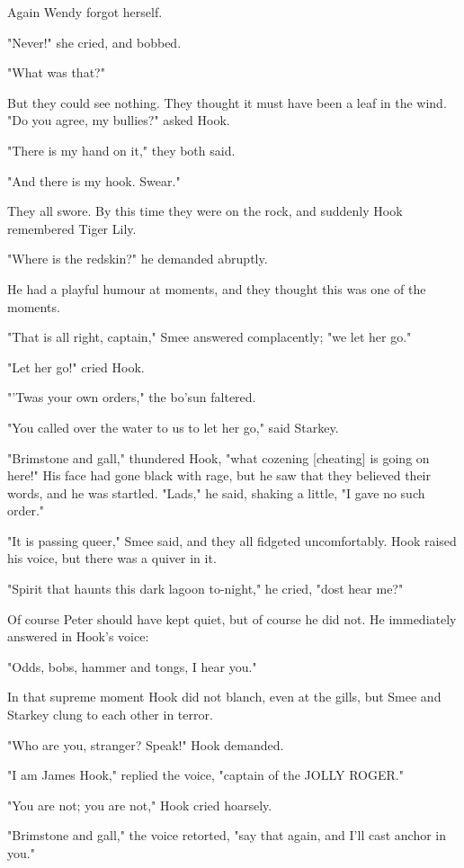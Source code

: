 Again Wendy forgot herself.


"Never!" she cried, and bobbed.


"What was that?"


But they could see nothing. They thought it must have been a leaf in the
wind. "Do you agree, my bullies?" asked Hook.


"There is my hand on it," they both said.


"And there is my hook. Swear."


They all swore. By this time they were on the rock, and suddenly Hook
remembered Tiger Lily.


"Where is the redskin?" he demanded abruptly.


He had a playful humour at moments, and they thought this was one of the
moments.


"That is all right, captain," Smee answered complacently; "we let her go."


"Let her go!" cried Hook.


"'Twas your own orders," the bo'sun faltered.


"You called over the water to us to let her go," said Starkey.


"Brimstone and gall," thundered Hook, "what cozening [cheating] is going
on here!" His face had gone black with rage, but he saw that they believed
their words, and he was startled. "Lads," he said, shaking a little, "I
gave no such order."


"It is passing queer," Smee said, and they all fidgeted uncomfortably.
Hook raised his voice, but there was a quiver in it.


"Spirit that haunts this dark lagoon to-night," he cried, "dost hear me?"


Of course Peter should have kept quiet, but of course he did not. He
immediately answered in Hook's voice:


"Odds, bobs, hammer and tongs, I hear you."


In that supreme moment Hook did not blanch, even at the gills, but Smee
and Starkey clung to each other in terror.


"Who are you, stranger? Speak!" Hook demanded.


"I am James Hook," replied the voice, "captain of the JOLLY ROGER."


"You are not; you are not," Hook cried hoarsely.


"Brimstone and gall," the voice retorted, "say that again, and I'll cast
anchor in you."


